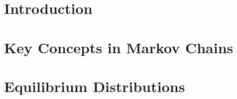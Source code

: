 \documentclass[british,11pt,a4paper]{report}
\begin{document}
\maketitle
\tableofcontents

\chapter{Introduction}

\chapter{Key Concepts in Markov Chains}

\chapter{Equilibrium Distributions}

\end{document}
